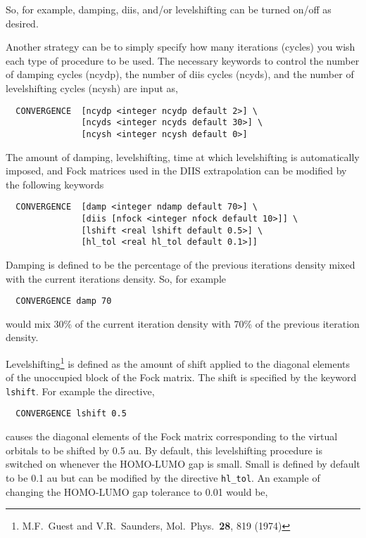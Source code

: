 So, for example, damping, diis, and/or levelshifting can be turned
on/off as desired.

Another strategy can be to simply specify how many iterations (cycles) you wish
each type of procedure to be used.  The necessary keywords to control
the number of damping cycles (ncydp), the number of diis cycles
(ncyds), and the number of levelshifting cycles (ncysh) are input as,

\begin{verbatim}
  CONVERGENCE  [ncydp <integer ncydp default 2>] \
               [ncyds <integer ncyds default 30>] \
               [ncysh <integer ncysh default 0>]
\end{verbatim}

The amount of damping, levelshifting, time at which levelshifting is
automatically imposed, and Fock matrices used in the DIIS
extrapolation can be modified by the following keywords

\begin{verbatim}
  CONVERGENCE  [damp <integer ndamp default 70>] \
               [diis [nfock <integer nfock default 10>]] \
               [lshift <real lshift default 0.5>] \
               [hl_tol <real hl_tol default 0.1>]]
\end{verbatim}

Damping is defined to be the percentage of the previous iterations
density mixed with the current iterations density.  So, for example 

\begin{verbatim}
  CONVERGENCE damp 70
\end{verbatim}

would mix 30\% of the current iteration density with 70\% of the
previous iteration density.

Levelshifting\footnote {M.F.~Guest and 
V.R.~Saunders, Mol.~Phys.~{\bf 28}, 819 (1974)} is defined as the
amount of shift applied to the diagonal elements of the unoccupied
block of the Fock matrix.  The shift is specified by the
keyword \verb+lshift+.  For example the directive,

\begin{verbatim}
  CONVERGENCE lshift 0.5
\end{verbatim}

causes the diagonal elements of the Fock matrix
corresponding to the virtual orbitals to be shifted by 0.5 au.
By default, this levelshifting procedure is switched on whenever the
HOMO-LUMO gap is small.  Small is defined by default to be 0.1 au but
can be modified by the directive \verb+hl_tol+.  An example of
changing the HOMO-LUMO gap tolerance to 0.01 would be,

